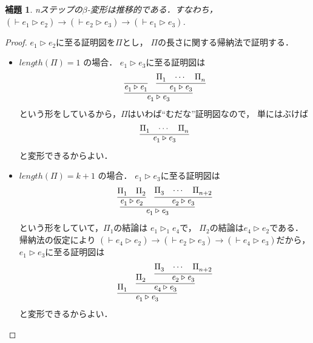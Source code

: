 \documentclass{ltjsbook}%
\newtheorem{lemma}{補題}[section]%
\begin{document}
\begin{lemma}%
  \label{lemma:beta_reduct_trans}%
  nステップの$\beta$-変形は推移的である．すなわち，%
  $(\vdash\mathit{e}_1^{}\triangleright\mathit{e}_2^{})\rightarrow%
  (\vdash\mathit{e}_2^{}\triangleright\mathit{e}_3^{})\rightarrow%
  (\vdash\mathit{e}_1^{}\triangleright\mathit{e}_3^{})$.%
\end{lemma}%
\begin{proof}%
  $\mathit{e}_1^{}\triangleright\mathit{e}_2^{}$に至る証明図を$\Pi$とし，%
  $\Pi$の長さに関する帰納法で証明する．%
  \begin{itemize}%
  \item $length(\Pi)=1$ の場合．%
    $\mathit{e}_1^{}\triangleright\mathit{e}_3^{}$に至る証明図は%
    \begin{equation}%
      \infer{%
        \mathit{e}_1^{}\triangleright\mathit{e}_3^{}%
      }{%
        \infer{\mathit{e}_1^{}\triangleright\mathit{e}_1^{}}{}%
      &%
        \infer{\mathit{e}_1^{}\triangleright\mathit{e}_3^{}}{\Pi_1^{}&\cdots&\Pi_n^{}}%
      }%
    \end{equation}%
    という形をしているから，$\Pi$はいわば``むだな''証明図なので，%
    単にはぶけば%
    \begin{equation}%
      \infer{\mathit{e}_1^{}\triangleright\mathit{e}_3^{}}{\Pi_1^{}&\cdots&\Pi_n^{}}%
    \end{equation}%
    と変形できるからよい．%
  \item $length(\Pi)=k + 1$ の場合．%
    $\mathit{e}_1^{}\triangleright\mathit{e}_3^{}$に至る証明図は%
    \begin{equation}%
      \infer{%
        \mathit{e}_1^{}\triangleright\mathit{e}_3^{}%
      }{%
        \infer{%
          \mathit{e}_1^{}\triangleright\mathit{e}_2^{}%
        }{%
          \Pi_1^{}%
        &%
          \Pi_2^{}%
        }%
      &%
        \infer{%
          \mathit{e}_2^{}\triangleright\mathit{e}_3^{}%
        }{%
          \Pi_3^{}&\cdots&\Pi_{n+2}^{}%
        }%
      }%
    \end{equation}%
    という形をしていて，$\Pi_1^{}$の結論は%
    $\mathit{e}_1^{}\triangleright_1^{}\mathit{e}_4^{}$で，%
    $\Pi_2^{}$の結論は$\mathit{e}_4^{}\triangleright\mathit{e}_2^{}$である．%
    帰納法の仮定により%
    $(\vdash\mathit{e}_4^{}\triangleright\mathit{e}_2^{})\rightarrow%
    (\vdash\mathit{e}_2^{}\triangleright\mathit{e}_3^{})\rightarrow%
    (\vdash\mathit{e}_4^{}\triangleright\mathit{e}_3^{})$だから，%
    $\mathit{e}_1^{}\triangleright\mathit{e}_3^{}$に至る証明図は%
    \begin{equation}%
      \infer{%
        \mathit{e}_1^{}\triangleright\mathit{e}_3^{}%
      }{%
        \Pi_1^{}%
      &%
        \infer{%
          \mathit{e}_4^{}\triangleright\mathit{e}_3^{}%
        }{%
          \Pi_2^{}%
        &%
          \infer{%
            \mathit{e}_2^{}\triangleright\mathit{e}_3^{}%
          }{%
            \Pi_3^{}&\cdots&\Pi_{n+2}^{}%
          }%
        }%
      }%
    \end{equation}%
    と変形できるからよい．%
  \end{itemize}%
\end{proof}%
\end{document}

